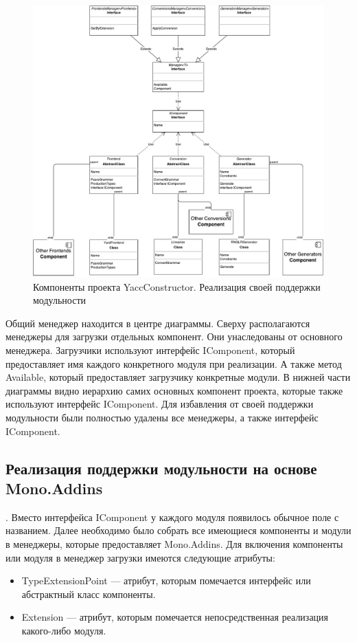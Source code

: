 \begin{figure}[h!]
\begin{center}
\includegraphics[width=\linewidth]{Orlov/yc_was}
\caption{Компоненты проекта YaccConstructor. Реализация своей поддержки модульности}
\label{fig:yc_was} 
\end{center}
\end{figure}

Общий менеджер находится в центре диаграммы. Сверху располагаются менеджеры для загрузки отдельных компонент. Они унаследованы от основного менеджера. Загрузчики используют интерфейс IComponent, который предоставляет имя каждого конкретного модуля при реализации. А также метод Available, который предоставляет загрузчику конкретные модули. В нижней части диаграммы видно иерархию самих основных компонент проекта, которые также используют интерфейс  IComponent. Для избавления от своей поддержки модульности были полностью удалены все менеджеры, а также интерфейс IComponent.

\subsection {Реализация поддержки модульности на основе \\Mono.Addins}.
Вместо интерфейса IComponent у каждого модуля появилось обычное поле с названием. Далее необходимо было собрать все имеющиеся компоненты и модули в менеджеры, которые предоставляет Mono.Addins. 
Для включения компоненты или модуля в менеджер загрузки имеются следующие атрибуты:
\begin{itemize}
\item TypeExtensionPoint --- атрибут, которым помечается интерфейс или абстрактный класс компоненты.
\item Extension --- атрибут, которым помечается непосредственная реализация какого-либо модуля.
\end{itemize}

